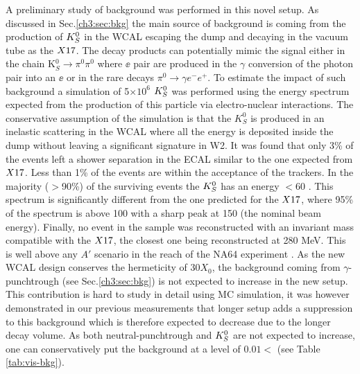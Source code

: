 A preliminary study of background was performed in this novel setup. As discussed in Sec.\ref{ch3:sec:bkg} the main source of background is coming from the production of $K^0_S$ in the WCAL escaping the dump and decaying in the vacuum tube as the $X17$. The decay products can potentially mimic the signal either in the chain K$^0_S \rightarrow \pi^0 \pi^0$ where $\ee$ pair are produced in the $\gamma$ conversion of the photon pair into an $\ee$ or in the rare decays $\pi^0 \rightarrow \gamma e^- e^+$. To estimate the impact of such background a simulation of 5$\times 10^6$ $K^0_S$ was performed using the energy spectrum expected from the production of this particle via electro-nuclear interactions.
The conservative assumption of the simulation is that the $K^0_S$ is produced in an inelastic scattering in the WCAL where all the energy is deposited inside the dump without leaving a significant signature in W2. It was found that only 3\% of the events left a shower separation in the ECAL similar to the one expected from $X17$. Less than 1\% of the events are within the acceptance of the trackers. In the majority ($>$90\%) of the surviving events the $K^0_S$ has an energy $<$60 \gev. This spectrum is significantly different from the one predicted for the $X17$, where 95\% of the spectrum is above 100 \gev with a sharp peak at 150 \gev (the nominal beam energy). Finally, no event in the sample was reconstructed with an invariant mass compatible with the $X17$, the closest one being reconstructed at 280 MeV. This is well above any $A'$ scenario in the reach of the NA64 experiment \cite{Banerjee:2019hmi}. As the new WCAL design conserves the hermeticity of 30$X_0$, the background coming from $\gamma$-punchtrough (see Sec.\ref{ch3:sec:bkg}) is not expected to increase in the new setup. This contribution is hard to study in detail using MC simulation, it was however demonstrated in our previous measurements \cite{Banerjee:2019hmi} that longer setup adds a suppression to this background which is therefore expected to decrease due to the longer decay volume. As both neutral-punchtrough and $K^0_S$ are not expected to increase, one can conservatively put the background at a level of $0.01<$ (see Table \ref{tab:vis-bkg}).

